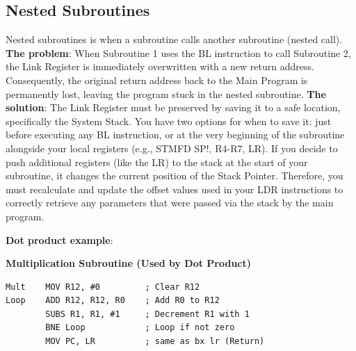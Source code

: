 \documentclass[../comorg-part1.tex]{subfiles}
\begin{document}
\subsection{Nested Subroutines}
Nested subroutines is when a subroutine calls another subroutine (nested call).\newline
\textbf{The problem}: When Subroutine 1 uses the BL instruction to call Subroutine 2, the Link Register is immediately overwritten with a new return address. Consequently, the original return address back to the Main Program is permanently lost, leaving the program stuck in the nested subroutine.\newline
\textbf{The solution}: The Link Register must be preserved by saving it to a safe location, specifically the System Stack. You have two options for when to save it: just before executing any BL instruction, or at the very beginning of the subroutine alongside your local registers (e.g., STMFD SP!, {R4-R7, LR}).\newline
If you decide to push additional registers (like the LR) to the stack at the start of your subroutine, it changes the current position of the Stack Pointer. Therefore, you must recalculate and update the offset values used in your LDR instructions to correctly retrieve any parameters that were passed via the stack by the main program.

\vspace{1em}
\noindent\textbf{Dot product example}:

\noindent
\begin{minipage}{\textwidth}
\noindent\textbf{Multiplication Subroutine (Used by Dot Product)}
\begin{lstlisting}
Mult    MOV R12, #0         ; Clear R12
Loop    ADD R12, R12, R0    ; Add R0 to R12
        SUBS R1, R1, #1     ; Decrement R1 with 1
        BNE Loop            ; Loop if not zero
        MOV PC, LR          ; same as bx lr (Return)
\end{lstlisting}
\end{minipage}

\vspace{1em}
\end{document}
